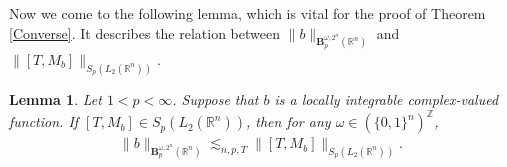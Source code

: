 \documentclass[oneside,english,a4wide]{amsart}
\numberwithin{equation}{section}
\numberwithin{figure}{section}
\theoremstyle{plain}
\theoremstyle{plain}
\theoremstyle{definition}
\theoremstyle{plain}
\newtheorem{lemma}[thm]{Lemma}
\theoremstyle{remark}
\theoremstyle{definition}
\theoremstyle{remark}
\theoremstyle{definition}
\newcommand{\8}{\infty}
\begin{document}
Now we come to the following lemma, which is vital for the proof of Theorem \ref{Converse}. It describes the relation between $\|b\|_{\pmb{B}_p^{\omega,2^n}(\mathbb{R}^n)}$ and $\|[T,M_b]\|_{S_p(L_2(\mathbb{R}^n))}$.

\begin{lemma}\label{conv1}
	Let $1<p<\infty$. Suppose that $b$ is a locally integrable complex-valued function. If $[T,M_b]\in S_p(L_2(\mathbb{R}^n))$, then for any $\omega\in(\{0,1\}^n)^\mathbb{Z}$,
	\begin{equation*}
		\begin{aligned}
			\|b\|_{\pmb{B}_p^{\omega,2^n}(\mathbb{R}^n)}\lesssim_{n,p,T}\|[T,M_b]\|_{S_p(L_2(\mathbb{R}^n))}.
		\end{aligned}
	\end{equation*}	
\end{lemma}	
\end{document}
